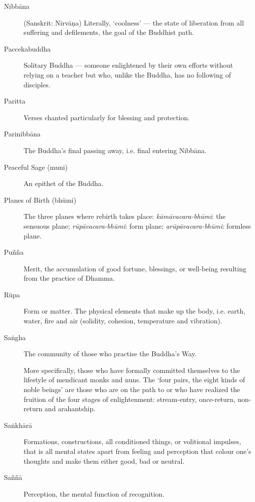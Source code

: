 \begin{description}
\item[Nibbāna] (Sanskrit: Nirvāṇa) Literally, ‘coolness’ --- the state of
  liberation from all suffering and defilements, the goal of the
  Buddhist path.

\item[Paccekabuddha] Solitary Buddha --- someone enlightened by their own
  efforts without relying on a teacher but who, unlike the Buddha, has
  no following of disciples.

\item[Paritta] Verses chanted particularly for blessing and protection.

\item[Parinibbāna] The Buddha’s final passing away, i.e. final entering
  Nibbāna.

\item[Peaceful Sage (muni)] An epithet of the Buddha.

\item[Planes of Birth (bhūmi)] The three planes where rebirth takes
  place: \emph{kāmāvacara-bhūmi}: the sensuous plane;
  \emph{rūpāvacara-bhūmi}: form plane; \emph{arūpāvacara-bhūmi}: formless
  plane.

\item[Puñña] Merit, the accumulation of good fortune, blessings, or
  well-being resulting from the practice of Dhamma.

\item[Rūpa] Form or matter. The physical elements that make up the body,
  i.e. earth, water, fire and air (solidity, cohesion, temperature and
  vibration).

\item[Saṅgha] The community of those who practise the Buddha’s Way.

  More specifically, those who have formally committed themselves to the
lifestyle of mendicant monks and nuns. The `four pairs, the eight kinds of
noble beings' are those who are on the path to or who have realized the
fruition of the four stages of enlightenment: stream-entry, once-return,
non-return and arahantship.

\item[Saṅkhārā] Formations, constructions, all conditioned things, or volitional
  impulses, that is all mental states apart from feeling and perception
  that colour one’s thoughts and make them either good, bad or neutral.

\item[Saññā] Perception, the mental function of recognition.


\end{description}
